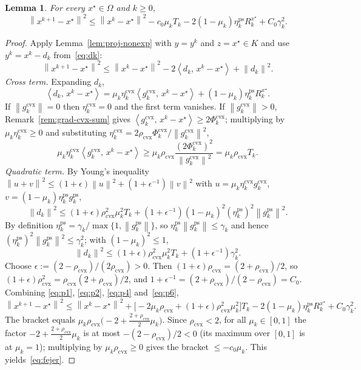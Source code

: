 \documentclass[]{interact}
\theoremstyle{plain}
\newtheorem{lemma}[theorem]{Lemma}
\theoremstyle{definition}
\theoremstyle{remark}
\newcommand{\norm}[1]{\left\lVert #1 \right\rVert}
\newcommand{\inner}[2]{\left\langle #1,\, #2 \right\rangle}
\newcommand{\cvx}{\mathrm{cvx}}
\newcommand{\ps}{\mathrm{ps}}
\begin{document}
\begin{lemma}\label{lem:fejer}
For every $x^\star\in\Omega$ and $k\ge 0$,
\begin{equation}\label{eq:fejer}
\norm{x^{k+1}-x^\star}^2\le\norm{x^k-x^\star}^2-c_0\mu_k T_k-2(1-\mu_k)\eta^{\ps}_k R^{x^\star}_k+C_0\gamma_k^2 .
\end{equation}
\end{lemma}
\begin{proof}
Apply Lemma~\ref{lem:proj-nonexp} with $y=y^k$ and $z=x^\star\in K$ and use
$y^k=x^k-d_k$ from~\eqref{eq:dk}:
\begin{equation}\label{eq:p1}
\norm{x^{k+1}-x^\star}^2\le\norm{x^k-x^\star}^2-2\inner{d_k}{x^k-x^\star}+\norm{d_k}^2 .
\end{equation}
\emph{Cross term.} Expanding $d_k$,
\begin{equation}\label{eq:p2}
\inner{d_k}{x^k-x^\star}=\mu_k\eta^{\cvx}_k\inner{g^{\cvx}_k}{x^k-x^\star}+(1-\mu_k)\eta^{\ps}_k R^{x^\star}_k .
\end{equation}
If $\norm{g^{\cvx}_k}=0$ then $\eta^{\cvx}_k=0$ and the first term vanishes. If
$\norm{g^{\cvx}_k}>0$, Remark~\ref{rem:grad-cvx-sum} gives
$\inner{g^{\cvx}_k}{x^k-x^\star}\ge 2\Phi^{\cvx}_k$; multiplying by
$\mu_k\eta^{\cvx}_k\ge 0$ and substituting
$\eta^{\cvx}_k=2\rho_{\cvx}\Phi^{\cvx}_k/\norm{g^{\cvx}_k}^2$,
\begin{equation}\label{eq:p4}
\mu_k\eta^{\cvx}_k\inner{g^{\cvx}_k}{x^k-x^\star}\ge\mu_k\rho_{\cvx}\frac{(2\Phi^{\cvx}_k)^2}{\norm{g^{\cvx}_k}^2}=\mu_k\rho_{\cvx}T_k .
\end{equation}
\emph{Quadratic term.} By Young's inequality
$\norm{u+v}^2\le(1+\epsilon)\norm{u}^2+(1+\epsilon^{-1})\norm{v}^2$ with
$u=\mu_k\eta^{\cvx}_k g^{\cvx}_k$, $v=(1-\mu_k)\eta^{\ps}_k g^{\ps}_k$,
\[
\norm{d_k}^2\le(1+\epsilon)\rho_{\cvx}^2\mu_k^2 T_k+(1+\epsilon^{-1})(1-\mu_k)^2(\eta^{\ps}_k)^2\norm{g^{\ps}_k}^2 .
\]
By definition $\eta^{\ps}_k=\gamma_k/\max\{1,\norm{g^{\ps}_k}\}$, so
$\eta^{\ps}_k\norm{g^{\ps}_k}\le\gamma_k$ and hence
$(\eta^{\ps}_k)^2\norm{g^{\ps}_k}^2\le\gamma_k^2$; with $(1-\mu_k)^2\le 1$,
\begin{equation}\label{eq:p6}
\norm{d_k}^2\le(1+\epsilon)\rho_{\cvx}^2\mu_k^2 T_k+(1+\epsilon^{-1})\gamma_k^2 .
\end{equation}
Choose $\epsilon:=(2-\rho_{\cvx})/(2\rho_{\cvx})>0$. Then
$(1+\epsilon)\rho_{\cvx}=(2+\rho_{\cvx})/2$, so
$(1+\epsilon)\rho_{\cvx}^2=\rho_{\cvx}(2+\rho_{\cvx})/2$, and
$1+\epsilon^{-1}=(2+\rho_{\cvx})/(2-\rho_{\cvx})=C_0$. Combining
\eqref{eq:p1}, \eqref{eq:p2}, \eqref{eq:p4} and~\eqref{eq:p6},
\[
\norm{x^{k+1}-x^\star}^2\le\norm{x^k-x^\star}^2+\bigl[-2\mu_k\rho_{\cvx}+(1+\epsilon)\rho_{\cvx}^2\mu_k^2\bigr]T_k-2(1-\mu_k)\eta^{\ps}_k R^{x^\star}_k+C_0\gamma_k^2 .
\]
The bracket equals
$\mu_k\rho_{\cvx}\bigl(-2+\tfrac{2+\rho_{\cvx}}{2}\mu_k\bigr)$. Since $\rho_{\cvx}<2$, for
all $\mu_k\in[0,1]$ the factor $-2+\tfrac{2+\rho_{\cvx}}{2}\mu_k$ is at most
$-(2-\rho_{\cvx})/2<0$ (its maximum over $[0,1]$ is at $\mu_k=1$); multiplying by
$\mu_k\rho_{\cvx}\ge0$ gives the bracket $\le -c_0\mu_k$. This yields~\eqref{eq:fejer}.
\end{proof}
\end{document}
